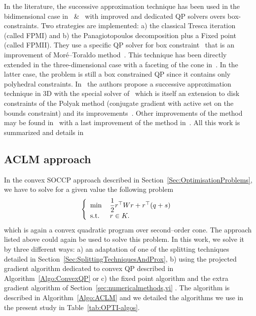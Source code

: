 In the literature, the successive approximation technique has been used in the bidimensional case in~\citep{Haslinger.ea_CMAME2002} \&~\citep{Dostal_JCAM2002} with improved and dedicated QP solvers overs box-constraints. Two strategies are implemented: a) the classical Tresca iteration (called FPMI) and  b) the Panagiotopoulos decomposition plus a Fixed point (called FPMII). They use  a specific QP solver for box constraint~\cite{Dostal_SIOPT1997} that is an improvement of Mor\'e--Toraldo method~\citep{More.Toraldo1991}. This technique has been directly extended in the three-dimensional case with a faceting of the cone in~\cite{Haslinger.ea_JCAM2004}. In the latter case, the problem is still a  box constrained QP since it contains only polyhedral constraints. In~\cite{Haslinger.ea_MCS2012} the authors propose a successive approximation technique in 3D with the special solver of~\cite{Kucera_OMS2007,Kucera_SIOPT2008} which is itself an extension to disk constraints of the Polyak method (conjugate gradient with active set on the bounds constraint) and its improvements~\cite{Dostal_SIOPT1997,Dostal.Schoberl_COA2005}. Other improvements of the method may be found in~\cite{Dostal.Kucera_SIOPT2010} with a last improvement of the method in~\cite{Dostal.Kozubek_MP2012}. All this work is summarized and details in ~\cite{Dostal.ea_AMM2016}


\subsection{ACLM approach}

In the convex SOCCP approach described in Section~\ref{Sec:OptimisationProblems}, we have to solve for a given value the following problem
\begin{equation}\label{eq:ACLM-4}
  \left\{
    \begin{array}{ll}
      \min\,&\Frac 1 2 r^\top W r + r^\top (q + s)  \\
      \text{s.t. } & r \in K.
    \end{array}
  \right.
\end{equation}
which is again a convex quadratic program over second--order cone. The approach listed above could again be used to solve this problem. In this work, we solve it by three different ways: a) an adaptation of one of the splitting techniques detailed in Section~\ref{Sec:SplittingTechniquesAndProx}, b) using the projected gradient algorithm dedicated to convex QP described in Algorithm~\ref{Algo:ConvexQP} or c) the fixed point algorithm and the extra gradient algorithm of Section~\ref{sec:numericalmethods,vi} . The algorithm is described in Algorithm~\ref{Algo:ACLM} and we detailed the algorithms we use in the present study in Table~\ref{tab:OPTI-algos}.

